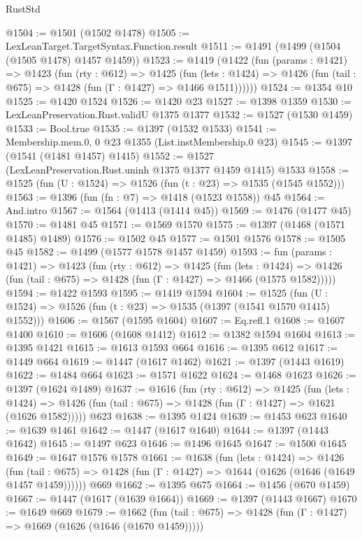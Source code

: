 \begin{lexlean}{RustStd}
\begin{coremodule}
@1504 := @1501 (@1502 @1478)
@1505 := LexLeanTarget.TargetSyntax.Function.result
@1511 := @1491 (@1499 (@1504 (@1505 @1478) @1457 @1459))
@1523 := @1419
    (@1422
      (fun (params : @1421) =>
      @1423
        (fun (rty : @612) =>
        @1425
          (fun (lets : @1424) =>
          @1426 (fun (tail : @675) => @1428 (fun (Γ : @1427) => @1466 @1511))))))
@1524 := @1354 @10
@1525 := @1420 @1524
@1526 := @1420 @23
@1527 := @1398 @1359
@1530 := LexLeanPreservation.Rust.validU @1375 @1377
@1532 := @1527 (@1530 @1459)
@1533 := Bool.true
@1535 := @1397 (@1532 @1533)
@1541 := Membership.mem.{0, 0} @23 @1355 (List.instMembership.{0} @23)
@1545 := @1397 (@1541 (@1481 @1457) @1415)
@1552 := @1527 (LexLeanPreservation.Rust.uninh @1375 @1377 @1459 @1415) @1533
@1558 := @1525 (fun (U : @1524) => @1526 (fun (t : @23) => @1535 (@1545 @1552)))
@1563 := @1396 (fun (fn : @7) => @1418 (@1523 @1558)) @45
@1564 := And.intro
@1567 := @1564 (@1413 (@1414 @45))
@1569 := @1476 (@1477 @45)
@1570 := @1481 @45
@1571 := @1569 @1570
@1575 := @1397 (@1468 (@1571 @1485) @1489)
@1576 := @1502 @45
@1577 := @1501 @1576
@1578 := @1505 @45
@1582 := @1499 (@1577 @1578 @1457 @1459)
@1593 := fun (params : @1421) =>
  @1423
    (fun (rty : @612) =>
    @1425
      (fun (lets : @1424) =>
      @1426 (fun (tail : @675) => @1428 (fun (Γ : @1427) => @1466 (@1575 @1582)))))
@1594 := @1422 @1593
@1595 := @1419 @1594
@1604 := @1525 (fun (U : @1524) => @1526 (fun (t : @23) => @1535 (@1397 (@1541 @1570 @1415) @1552)))
@1606 := @1567 (@1595 @1604)
@1607 := Eq.refl.{1}
@1608 := @1607 @1400
@1610 := @1606 (@1608 @1412)
@1612 := @1382 @1594 @1604
@1613 := @1395 @1421
@1615 := @1613 @1593 @664
@1616 := @1395 @612
@1617 := @1449 @664
@1619 := @1447 (@1617 @1462)
@1621 := @1397 (@1443 @1619)
@1622 := @1484 @664
@1623 := @1571 @1622
@1624 := @1468 @1623
@1626 := @1397 (@1624 @1489)
@1637 := @1616
    (fun (rty : @612) =>
    @1425
      (fun (lets : @1424) =>
      @1426 (fun (tail : @675) => @1428 (fun (Γ : @1427) => @1621 (@1626 @1582)))))
    @623
@1638 := @1395 @1424
@1639 := @1453 @623
@1640 := @1639 @1461
@1642 := @1447 (@1617 @1640)
@1644 := @1397 (@1443 @1642)
@1645 := @1497 @623
@1646 := @1496 @1645
@1647 := @1500 @1645
@1649 := @1647 @1576 @1578
@1661 := @1638
    (fun (lets : @1424) =>
    @1426
      (fun (tail : @675) => @1428 (fun (Γ : @1427) => @1644 (@1626 (@1646 (@1649 @1457 @1459))))))
    @669
@1662 := @1395 @675
@1664 := @1456 (@670 @1459)
@1667 := @1447 (@1617 (@1639 @1664))
@1669 := @1397 (@1443 @1667)
@1670 := @1649 @669
@1679 := @1662
    (fun (tail : @675) => @1428 (fun (Γ : @1427) => @1669 (@1626 (@1646 (@1670 @1459)))))

\end{coremodule}
\end{lexlean}
